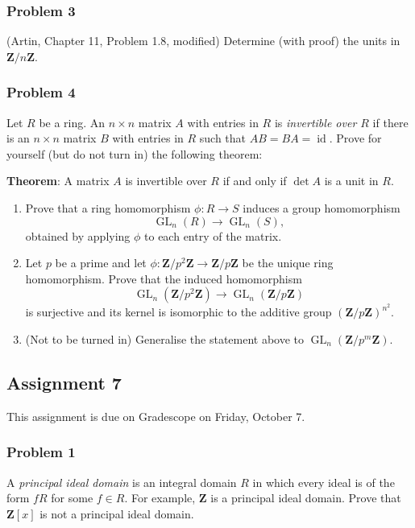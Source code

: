 \documentclass[11pt]{article}
\begin{document}
\subsubsection*{Problem 3}
\label{sec:orgb61a327}
(Artin, Chapter 11, Problem 1.8, modified)
Determine (with proof) the units in \(\mathbf{Z} / n \mathbf{Z}\).

\subsubsection*{Problem 4}
\label{sec:orgdda8383}
Let \(R\) be a ring.
An \(n \times n\) matrix \(A\) with entries in \(R\) is \emph{invertible over \(R\)} if there is an \(n \times n\) matrix \(B\) with entries in \(R\) such that \(AB = BA = \operatorname{id}\).
Prove for yourself (but do not turn in) the following theorem:

\textbf{\textbf{Theorem}}: A matrix \(A\) is invertible over \(R\) if and only if \(\det A\) is a unit in \(R\).

\begin{enumerate}
\item Prove that a ring homomorphism \(\phi \colon R \to S\) induces a group homomorphism
\[ \operatorname{GL}_n(R) \to \operatorname{GL}_n(S),\]
obtained by applying \(\phi\) to each entry of the matrix.
\item Let \(p\) be a prime and let \(\phi \colon \mathbf{Z}/ p^2 \mathbf{Z} \to \mathbf{Z} / p \mathbf{Z}\) be the unique ring homomorphism.
Prove that the induced homomorphism
\[ \operatorname{GL}_n(\mathbf{Z}/p^2 \mathbf{Z}) \to \operatorname{GL}_n(\mathbf{Z} / p \mathbf{Z})\]
is surjective and its kernel is isomorphic to the additive group \((\mathbf{Z} / p \mathbf{Z})^{n^2}\).
\item (Not to be turned in) Generalise the statement above to \(\operatorname{GL}_n(\mathbf{Z}/p^m \mathbf{Z})\).
\end{enumerate}

\subsection*{Assignment 7}
\label{sec:orgd03f36b}
This assignment is due on Gradescope on Friday, October 7.
\subsubsection*{Problem 1}
\label{sec:orgb6f5ca4}
A \emph{principal ideal domain} is an integral domain \(R\) in which every ideal is of the form \(fR\) for some \(f \in R\).
For example, \(\mathbf{Z}\) is a principal ideal domain.
Prove that \(\mathbf{Z}[x]\) is not a principal ideal domain.
\end{document}
